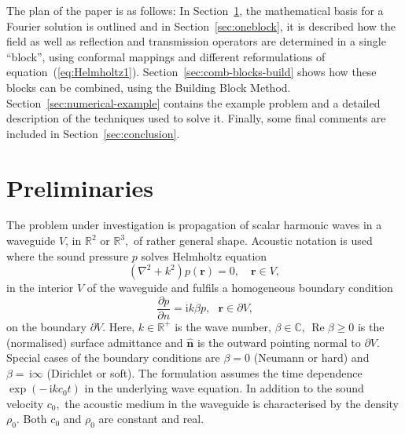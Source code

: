 \documentclass[numreferences]{kluwer}
\renewcommand{\Re}{\operatorname{Re}}
\renewcommand{\i}{\,\mathrm{i}}
\begin{document}
The plan of the paper is as follows: In Section~\ref{sec:prel}, the
mathematical basis for a Fourier solution is outlined and in
Section~\ref{sec:oneblock}, it is described how the field as well as
reflection and transmission operators are determined in a single
``block'', using conformal mappings and different reformulations of
equation~(\ref{eq:Helmholtz1}).  Section~\ref{sec:comb-blocks-build}
shows how these blocks can be combined, using the Building Block
Method. Section~\ref{sec:numerical-example} contains the example
problem and a detailed description of the techniques used to solve
it. Finally, some final comments are included in
Section~\ref{sec:conclusion}.

\section{Preliminaries}
\label{sec:prel}

The problem under investigation is propagation of scalar harmonic
waves in a waveguide $V$, in $\mathbb{R}^{2}$ or $\mathbb{R}^{3},$ of
rather general shape. Acoustic notation is used where the sound
pressure $p$ solves Helmholtz equation%
\begin{equation}
  (\nabla^{2}+k^{2})p(\bm{r})=0,\quad\bm{r}\in V, \label{101}%
\end{equation}
in the interior $V$ of the waveguide and fulfils a homogeneous
boundary condition%
\begin{equation}
  \dfrac{\partial p}{\partial n}=\text{i}k\beta p,
  \text{ }\bm{r}\in\partial V\text{,} \label{102}%
\end{equation}
on the boundary $\partial V$. Here, $k\in\mathbb{R}^{+}$ is the
wave number, $\beta\in\mathbb{C}$, $\Re\beta\geq0$ is the (normalised)
surface admittance and $\widehat{\bm{n}}$ is the outward pointing
normal to $\partial V$. Special cases of the boundary conditions are
$\beta=0$ (Neumann or hard) and $\beta=\i\infty$ (Dirichlet or
soft). The formulation assumes the time dependence $\exp(-\i kc_{0}t)$
in the underlying wave equation. In addition to the sound velocity
$c_{0},$ the acoustic medium in the waveguide is characterised by the
density $\rho_{0}.$ Both $c_{0}$ and $\rho_{0}$ are constant and real.
\end{document}
